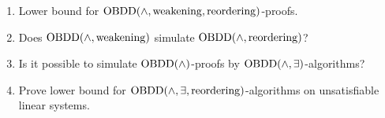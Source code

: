 \begin{frame}
	\begin{enumerate}
        \item Lower bound for $\mathrm{OBDD}(\land, \mathrm{weakening}, \mathrm{reordering})$-proofs.
        \item Does $\mathrm{OBDD}(\land, \mathrm{weakening})$ simulate $\mathrm{OBDD}(\land, \mathrm{reordering})$?
        \item Is it possible to simulate $\mathrm{OBDD}(\land)$-proofs by $\mathrm{OBDD}(\land, \exists)$-algorithms?
        \item Prove lower bound for $\mathrm{OBDD}(\land, \exists, \mathrm{reordering})$-algorithms on unsatisfiable
            linear systems.
    \end{enumerate}    
\end{frame}
